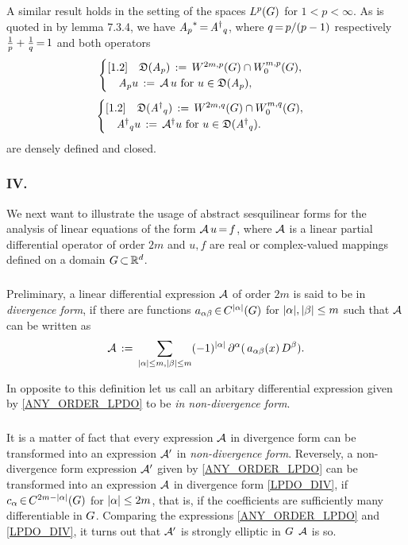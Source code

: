 \documentclass[11pt,twoside]{article}
\begin{document}
\subparagraph{} %
A similar result holds in the setting of the spaces $L^p(G)$ for $1 < p < \infty$.
As is quoted in \cite{Pa} by lemma 7.3.4,
we have 
${\mathit{A}_p}^* {\,=\,} {{\mathit{A}}^{\dag}}_q$,
where $q {\,=\,} p/(p-1)$ respectively $\frac{1}{p} + \frac{1}{q} {\,=\,} 1$
and both operators
\[
\begin{cases}[1.2]
\quad \mathfrak{D}(\mathit{A}_p) \,:=\, W^{2m,p}(G) \cap W_0^{m,p}(G),\\
\quad \mathit{A}_p u \,:=\, {\mathcal{A}}\,u \mbox{ for } u \in \mathfrak{D}(\mathit{A}_p),\\
\end{cases}
\]
\[
\begin{cases}[1.2]
\quad \mathfrak{D}({\mathit{A}^{\dag}}_q) \,:=\, W^{2m,q}(G) \cap W_0^{m,q}(G),\\
\quad {\mathit{A}^{\dag}}_q u \,:=\, {\mathcal{A}}^{\dag} u
      \mbox{ for } u \in \mathfrak{D}({\mathit{A}^{\dag}}_q).\\
\end{cases}
\]
are densely defined and closed.

\subsubsection{IV. \TITLED}
We next want to illustrate the usage of abstract sesquilinear
forms for the analysis of linear equations of the form ${\mathcal{A}} \, u {\,=\,} f$,
where ${\mathcal{A}}$ is a linear partial differential operator of order $2m$
and $u,f$ are real or complex-valued mappings
defined on a domain $G {\,\subset\,} {\mathbb{R}}^d$.

\subparagraph{} %
Preliminary,
a linear differential expression ${\mathcal{A}}$ of order $2m$
is said to be in \textit{divergence form},
if there are functions $a_{\alpha \beta} \xeof C^{\abs{\alpha} }(\G)$
for $\abs{\alpha} , \abs{\beta} \leq m$
such that ${\mathcal{A}}$ can be written as
\begin{equation}\label{LPDO_DIV}
\A \eqdef
\sum_{\abs{\alpha} \leq m, \abs{\beta} \leq m} (-1)^{\abs{\alpha} } \,
\PA(\,a_{\alpha \beta}(x) \, D^{\beta}).
\end{equation}

In opposite to this definition let us call an arbitary differential expression
given by \eqref{ANY_ORDER_LPDO} to be \textit{in non-divergence form}.

\subparagraph{} %
It is a matter of fact
that every expression ${\mathcal{A}}$ in divergence form
can be transformed into an expression ${\mathcal{A}}'$ in \textit{non-divergence form}.
Reversely,
a non-divergence form expression ${\mathcal{A}}'$ given by \eqref{ANY_ORDER_LPDO}
can be transformed into an expression ${\mathcal{A}}$ in divergence form \eqref{LPDO_DIV},
if $c_{\alpha} \xeof C^{2m - \abs{\alpha} }(\G)$ for $\abs{\alpha} \leq 2m$,
that is,
if the coefficients are sufficiently many differentiable in $G$.
Comparing the expressions \eqref{ANY_ORDER_LPDO} and \eqref{LPDO_DIV},
it turns out that
${\mathcal{A}}'$ is strongly elliptic in $G$ \iff ${\mathcal{A}}$ is so.
\end{document}
